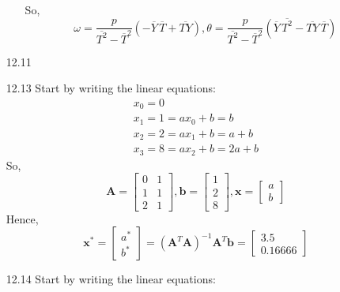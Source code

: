 \documentclass{article}
\begin{document}
\begin{itemize}
\begin{enumerate}
\begin{displaymath}
				\end{displaymath}
				So,
				\begin{displaymath}
					\omega = \frac{p}{\overline{T^2} - \overline{T}^2} (- \overline{Y} \, \overline{T} + \overline{TY}), 
\theta = \frac{p}{\overline{T^2} - \overline{T}^2} ( \overline{Y} \, \overline{T^2} - \overline{TY} \, \overline{T})
				\end{displaymath}
		\end{enumerate}
	\item[12.11]
	\item[12.13]
		Start by writing the linear equations:
		\begin{displaymath} \begin{array}{l}
			x_0 = 0 \\
			x_1 = 1 = a x_0 + b = b \\
			x_2 = 2 = a x_1 + b = a + b \\
			x_3 = 8 = a x_2 + b = 2a + b
		\end{array} \end{displaymath}
		So,
		\begin{displaymath}
			\boldsymbol{A} = \left[ \begin{array}{cc} 0 & 1 \\ 1 & 1 \\ 2 & 1 \end{array} \right],
			\boldsymbol{b} = \left[ \begin{array}{c} 1 \\ 2 \\ 8 \end{array} \right],
			\boldsymbol{x} = \left[ \begin{array}{c} a \\ b \end{array} \right]
		\end{displaymath}
		Hence,
		\begin{displaymath}
			\boldsymbol{x}^* = \left[ \begin{array}{c} a^* \\ b^* \end{array} \right] = (\boldsymbol{A}^T \boldsymbol{A})^{-1} \boldsymbol{A}^T \boldsymbol{b} = \left[ \begin{array}{c} 3.5 \\ 0.16666 \end{array} \right]
		\end{displaymath}
	\item[12.14]
		Start by writing the linear equations:
		\begin{displaymath} \begin{array}{l}

\end{array}
\end{displaymath}
\end{itemize}
\end{document}
